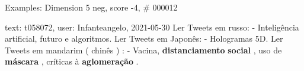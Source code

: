 \begin{frame}{Examples: Dimension 5 neg, score -4, \# 000012}
\footnotesize
\begin{alertblock}{text: t058072, user: Infanteangelo, 2021-05-30}
Ler Tweets em russo: - Inteligência artificial, futuro e algoritmos. Ler Tweets 
em Japonês: - Hologramas 5D. Ler Tweets em mandarim ( chinês ) : - Vacina, 
\textbf{distanciamento} \textbf{social} , uso de \textbf{máscara} , críticas à 
\textbf{aglomeração} . 
\end{alertblock}
\end{frame}
